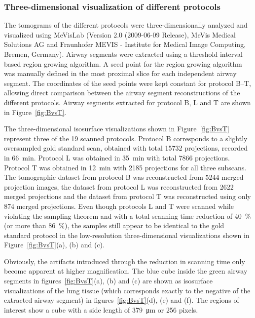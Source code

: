 \subsubsection{Three-dimensional visualization of different protocols}
\label{subsec:comparison}
The tomograms of the different protocols were three-dimensionally analyzed and visualized using MeVisLab (Version 2.0 (2009-06-09 Release), MeVis Medical Solutions AG and Fraunhofer MEVIS - Institute for Medical Image Computing, Bremen, Germany). Airway segments were extracted using a threshold interval based region growing algorithm. A seed point for the region growing algorithm was manually defined in the most proximal slice for each independent airway segment. The coordinates of the seed points were kept constant for protocol B--T, allowing direct comparison between the airway segment reconstructions of the different protocols. Airway segments extracted for protocol B, L and T are shown in Figure~\ref{fig:BvsT}.

The three-dimensional isosurface visualizations shown in Figure~\ref{fig:BvsT} represent three of the 19 scanned protocols. Protocol B corresponds to a slightly oversampled gold standard scan, obtained with total 15732 projections, recorded in \SI{66}{\minute}. Protocol L was obtained in \SI{35}{\minute} with total 7866 projections. Protocol T was obtained in \SI{12}{\minute} with 2185 projections for all three subscans. The tomographic dataset from protocol B was reconstructed from 5244 merged projection images, the dataset from protocol L was reconstructed from 2622 merged projections and the dataset from protocol T was reconstructed using only 874 merged projections. Even though protocols L and T were scanned while violating the sampling theorem and with a total scanning time reduction of \SI{40}{\percent} (or more than \SI{86}{\percent}), the samples still appear to be identical to the gold standard protocol in the low-resolution three-dimensional visualizations shown in Figure~\ref{fig:BvsT}(a), (b) and (c).

Obviously, the artifacts introduced through the reduction in scanning time only become apparent at higher magnification. The blue cube inside the green airway segments in figures~\ref{fig:BvsT}(a), (b) and (c) are shown as isosurface visualizations of the lung tissue (which corresponds exactly to the negative of the extracted airway segment) in figures~\ref{fig:BvsT}(d), (e) and (f). The regions of interest show a cube with a side length of \SI{379}{\micro\meter} or 256 pixels.

